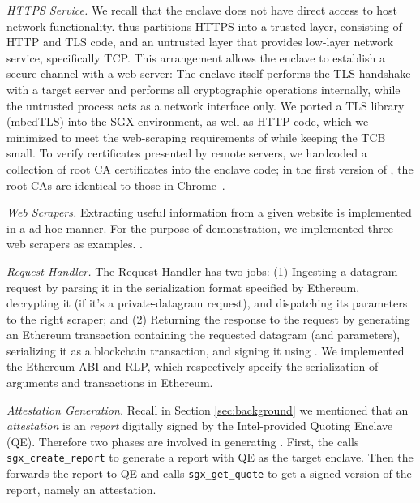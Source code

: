 \vspace{2mm}

\noindent\emph{HTTPS Service.} We recall that the enclave does not have direct
access to host network functionality. \tc thus partitions HTTPS into a trusted
layer, consisting of HTTP and TLS code, and an untrusted layer that provides
low-layer network service, specifically TCP.  This arrangement allows the
enclave to establish a secure channel with a web server: The enclave itself
performs the TLS handshake with a target server and performs all cryptographic
operations internally, while the untrusted process acts as a network interface
only. We ported a TLS library (mbedTLS) into the SGX environment, as well as
HTTP code, which we minimized to meet the web-scraping requirements of \tc while
keeping the TCB small. To verify certificates presented by remote servers, we
hardcoded a collection of root CA certificates into the enclave code; in the
first version of \tc, the root CAs are identical to those in Chrome~\cite{}.

\vspace{2mm}

\noindent\emph{Web Scrapers.} Extracting useful information from a given website
is implemented in a ad-hoc manner. For the purpose of demonstration, we
implemented three web scrapers as examples. .

\vspace{2mm}

\noindent\emph{Request Handler.} The Request Handler has two jobs: (1) Ingesting
a datagram request by parsing it in the serialization format specified by
Ethereum, decrypting it (if it's a private-datagram request), and dispatching
its parameters to the right scraper; and (2) Returning the response to the
request by generating an Ethereum transaction containing the requested datagram
(and parameters), serializing it as a blockchain transaction, and signing it
using \skTC. We implemented the Ethereum ABI and RLP, which respectively specify
the serialization of arguments and transactions in Ethereum. 

\vspace{2mm}

\noindent\emph{Attestation Generation.} Recall in Section \ref{sec:background}
we mentioned that an \emph{attestation} is an \emph{report} digitally signed by
the Intel-provided Quoting Enclave (QE).  Therefore two phases are involved in
generating \att. First, the \encname calls \texttt{sgx\_create\_report} to
generate a report with QE as the target enclave. Then the \medname forwards the
report to QE and calls \texttt{sgx\_get\_quote} to get a signed version of the
report, namely an attestation.

